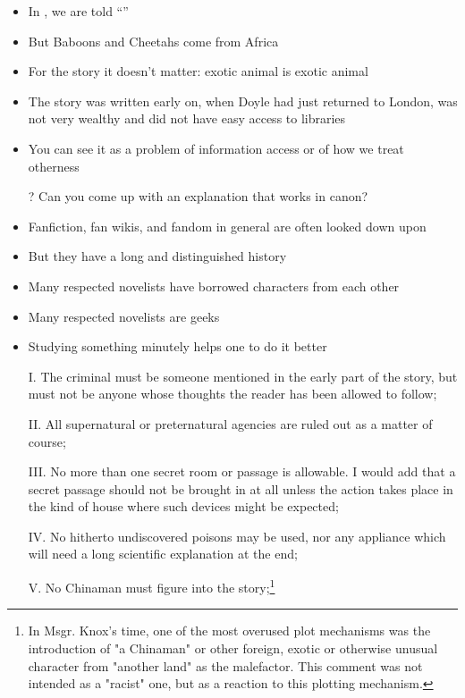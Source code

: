 \documentclass[a4paper,landscape,headrule,footrule,xetex]{foils}
\begin{document}
\begin{itemize}
\item In ,  we are told ``''
\item But Baboons and Cheetahs come from Africa
\item For the story it doesn't matter: exotic animal is exotic animal
\item The story was written early on, when Doyle had just returned to
  London, was not very wealthy and did not have easy access to
  libraries
\item You can see it as a problem of information access or of how we
  treat otherness
\item[?] Can you come up with an explanation that works in canon? \task


\end{itemize}


\begin{itemize}
\item Fanfiction, fan wikis, and fandom in general are often looked down upon
\item But they have a long and distinguished history
\item Many respected novelists have borrowed characters from each other
\item Many respected novelists are geeks
\item Studying something minutely helps one to do it better
\end{itemize}




\begin{itemize}
\item[I.]     The criminal must be someone mentioned in the early part of the story, but must not be anyone whose thoughts the reader has been allowed to follow;
\item[II.]    All supernatural or preternatural agencies are ruled out as a matter of course;
\item[III.]   No more than one secret room or passage is allowable.  I would add that a secret passage should not be brought in at all unless the action takes place in the kind of house where such devices might be expected;
\item[IV.]   No hitherto undiscovered poisons may be used, nor any appliance which will need a long scientific explanation at the end;
\item[V.]    No Chinaman must figure into the story;\footnote{In Msgr. Knox's time, one of the most overused plot mechanisms was the introduction of "a Chinaman" or other foreign, exotic or otherwise unusual character from "another land" as the malefactor.  This comment was not intended as a "racist" one, but as a reaction to this plotting mechanism.}
\end{itemize}
\newpage
\end{document}
